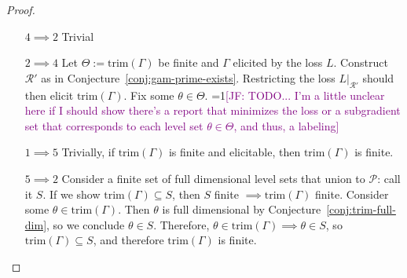 \documentclass[12pt]{article}
\newcommand{\Comments}{1}
\newcommand{\mynote}[2]{\ifnum\Comments=1\textcolor{#1}{#2}\fi}
\newcommand{\jessie}[1]{\mynote{purple}{[JF: #1]}}
\newcommand{\E}{\mathbb{E}}
\renewcommand{\P}{\mathcal{P}}
\newcommand{\R}{\mathcal{R}}
\newcommand{\inter}[1]{\mathring{#1}}%
\newcommand{\trim}{\mathrm{trim}}
\newcommand{\strip}{\mathrm{strip}}
\DeclareMathOperator*{\argmin}{arg\,min}
\begin{document}
\begin{proof}
\begin{enumerate}
%
%
%


\item[$4 \implies 2$] Trivial
\item[$2 \implies 4$] 
Let $\Theta := \trim(\Gamma)$ be finite and $\Gamma$ elicited by the loss $L$.
Construct $\R'$ as in Conjecture~\ref{conj:gam-prime-exists}.
Restricting the loss $L|_{\R'}$ should then elicit $\trim(\Gamma)$.
Fix some $\theta \in \Theta$.
\jessie{TODO... I'm a little unclear here if I should show there's a report that minimizes the loss or a subgradient set that corresponds to each level set $\theta \in \Theta$, and thus, a labeling}

\item[$1\implies 5$] Trivially, if $\trim(\Gamma)$ is finite and elicitable, then $\trim(\Gamma)$ is finite.
\item[$5 \implies 2$] Consider a finite set of full dimensional level sets that union to $\P$: call it $S$.
If we show $\trim(\Gamma) \subseteq S$, then $S$ finite $\implies \trim(\Gamma)$ finite.
Consider some $\theta \in \trim(\Gamma)$.
Then $\theta$ is full dimensional by Conjecture~\ref{conj:trim-full-dim}, so we conclude $\theta \in S$.
Therefore, $\theta \in \trim(\Gamma) \implies \theta \in S$, so $\trim(\Gamma) \subseteq S$, and therefore $\trim(\Gamma)$ is finite.


\end{enumerate}
\end{proof}
\end{document}
